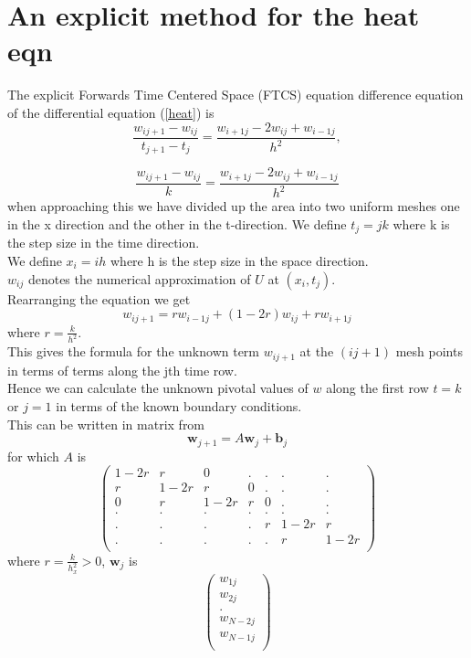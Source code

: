 \section{An explicit method for the heat eqn}
The explicit Forwards Time Centered Space (FTCS) equation difference equation of the differential equation (\ref{heat}) is
\begin{equation}
\frac{w_{ij+1}-w_{ij}}{t_{j+1}-t_{j}}=\frac{w_{i+1j}-2w_{ij}+w_{i-1j}}{h^2},
\end{equation}

\begin{equation*}
\frac{w_{ij+1}-w_{ij}}{k}=\frac{w_{i+1j}-2w_{ij}+w_{i-1j}}{h^2}
\end{equation*}
when approaching this we have divided up the area into
two uniform meshes one in the x direction and the other in the t-direction.
We define $t_j=jk$ where k is the step size in the time direction.\\
We define $x_i=ih$ where h is the step size in the space direction.\\
$w_{ij}$ denotes the numerical approximation of $U$ at $(x_i,t_j)$.\\
Rearranging the equation we get
\begin{equation}\label{disc heat}
w_{ij+1}=rw_{i-1j}+(1-2r)w_{ij}+rw_{i+1j}
\end{equation}
where $r=\frac{k}{h^2}$.\\
This gives the formula for the unknown term $w_{ij+1}$ at the $(ij+1)$ mesh points
in terms of terms along the jth time row.\\
Hence we can calculate the unknown pivotal values of $w$ along the first row $t=k$ or $j=1$ in terms of the known boundary conditions.\\
This can be written in matrix from 
\[ \mathbf{w}_{j+1}=A\mathbf{w}_{j} +\mathbf{b}_{j} \]
for which $A$ is
\[
\left(\begin{array}{ccccccc}
1-2r&r&0&.&.&.&.\\
r&1-2r&r&0&.&.&.\\
0&r&1-2r&r&0&.&.\\
.&.&.&.&.&.&.\\
.&.&.&.&r&1-2r&r\\
.&.&.&.&.&r&1-2r\\
\end{array}\right)
\]
where $r=\frac{k}{h_x^2}>0$, $\mathbf{w}_j$ is 
\[
\left(\begin{array}{c}
w_{1j}\\
w_{2j}\\
.\\
w_{N-2j}\\
w_{N-1j}\\

\end{array}\right)
\]
